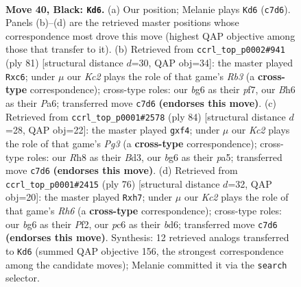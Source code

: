 \documentclass[11pt]{article}
\begin{document}
\clearpage

\begin{figure}[p]\centering
\begin{subfigure}{0.46\textwidth}\centering
\resizebox{\linewidth}{!}{%
\newchessgame
\chessboard[
  setfen={7r/2k2P2/R1P3Bb/1R6/1P4rp/8/5K2/8 b - - 2 40},
  showmover=false,
  pgfstyle=straightmove, color=movearrow, markmove={c7-d6}
]}
\caption{}
\end{subfigure}\hfill
\begin{subfigure}{0.46\textwidth}\centering
\resizebox{\linewidth}{!}{%
\newchessgame
\chessboard[
  setfen={5r2/2k2P1R/prP3p1/4p3/8/8/4KP1P/2R5 b - - 0 41},
  showmover=false,
  pgfstyle=straightmove, color=movearrow, markmove={b6-c6}
]}
\caption{}
\end{subfigure}
\\[4pt]
\begin{subfigure}{0.46\textwidth}\centering
\resizebox{\linewidth}{!}{%
\newchessgame
\chessboard[
  setfen={8/4kp2/8/p1rb4/R4p2/P2B2P1/3K4/8 w - - 0 43},
  showmover=false,
  pgfstyle=straightmove, color=movearrow, markmove={g3-f4}
]}
\caption{}
\end{subfigure}\hfill
\begin{subfigure}{0.46\textwidth}\centering
\resizebox{\linewidth}{!}{%
\newchessgame
\chessboard[
  setfen={5k2/4p2p/3b3R/1R1P4/5r1p/8/5P2/6K1 w - - 0 39},
  showmover=false,
  pgfstyle=straightmove, color=movearrow, markmove={h6-h7}
]}
\caption{}
\end{subfigure}
\caption{\textbf{Move 40, Black: \texttt{Kd6}.} (a) Our position; Melanie plays \texttt{Kd6} (\texttt{c7d6}). Panels (b)--(d) are the retrieved master positions whose correspondence most drove this move (highest QAP objective among those that transfer to it). (b) Retrieved from \texttt{ccrl\_top\_p0002\#941} (ply 81) [structural distance $d$=30, QAP obj=34]: the master played \texttt{Rxc6}; under $\mu$ our \emph{Kc2} plays the role of that game's \emph{Rb3} (a \textbf{cross-type} correspondence); cross-type roles: our \emph{b}g6 as their \emph{p}f7, our \emph{B}h6 as their \emph{P}a6; transferred move \texttt{c7d6} \textbf{(endorses this move)}. (c) Retrieved from \texttt{ccrl\_top\_p0001\#2578} (ply 84) [structural distance $d$=28, QAP obj=22]: the master played \texttt{gxf4}; under $\mu$ our \emph{Kc2} plays the role of that game's \emph{Pg3} (a \textbf{cross-type} correspondence); cross-type roles: our \emph{R}h8 as their \emph{B}d3, our \emph{b}g6 as their \emph{p}a5; transferred move \texttt{c7d6} \textbf{(endorses this move)}. (d) Retrieved from \texttt{ccrl\_top\_p0001\#2415} (ply 76) [structural distance $d$=32, QAP obj=20]: the master played \texttt{Rxh7}; under $\mu$ our \emph{Kc2} plays the role of that game's \emph{Rh6} (a \textbf{cross-type} correspondence); cross-type roles: our \emph{b}g6 as their \emph{P}f2, our \emph{p}c6 as their \emph{b}d6; transferred move \texttt{c7d6} \textbf{(endorses this move)}. Synthesis: 12 retrieved analogs transferred to \texttt{Kd6} (summed QAP objective 156, the strongest correspondence among the candidate moves); Melanie committed it via the \texttt{search} selector.}
\label{fig:thought-m79}
\end{figure}
\end{document}
